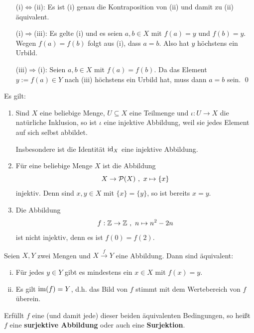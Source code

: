 \begin{bew} \quad
    \begin{itemize}
        \item[(i)$\Leftrightarrow$(ii):] Es ist (i) genau die Kontraposition von (ii) und damit zu (ii) äquivalent.
        \item[(i)$\Rightarrow$(iii):] Es gelte (i) und es seien $a,b\in X$ mit $f(a)=y$ und $f(b)=y$. Wegen $f(a)=f(b)$ folgt aus (i), dass $a=b$. Also hat $y$ höchstens ein Urbild.
        \item[(iii)$\Rightarrow$(i):] Seien $a,b\in X$ mit $f(a)=f(b)$. Da das Element $y:=f(a)\in Y$ nach (iii) höchstens ein Urbild hat, muss dann $a=b$ sein. \qed
    \end{itemize}
\end{bew}


\begin{bsp} Es gilt:
    \begin{enumerate}
        \item Sind $X$ eine beliebige Menge, $U\subseteq X$ eine Teilmenge und $\iota : U\to X$ die natürliche Inklusion, so ist $\iota$ eine injektive Abbildung, weil sie jedes Element auf sich selbst abbildet.
        
        Insbesondere ist die Identität $\mathrm{id}_X$ eine injektive Abbildung.
        \item Für eine beliebige Menge $X$ ist die Abbildung
            \[ X \to \mathcal P(X) \ ,\ x \mapsto \{x\} \]
        injektiv. Denn sind $x,y\in X$ mit $\{x\}=\{y\}$, so ist bereits $x=y$.
        \item Die Abbildung
            \[ f:\mathbb Z \to \mathbb Z \ ,\ n \mapsto n^2-2n \]
        ist nicht injektiv, denn es ist $f(0)=f(2)$.
    \end{enumerate}
\end{bsp}
	

\begin{de} \label{def:surjektiv} 
    Seien $X,Y$ zwei Mengen und $X \xrightarrow{f} Y$ eine Abbildung. Dann sind äquivalent:
    \begin{enumerate}[(i)]
        \item Für jedes $y\in Y$ gibt es mindestens ein $x\in X$ mit $f(x)=y$.
        \item Es gilt $\operatorname{im}(f) = Y$, d.h. das Bild von $f$ stimmt mit dem Wertebereich von $f$ überein.
    \end{enumerate}
    Erfüllt $f$ eine (und damit jede) dieser beiden äquivalenten Bedingungen, so heißt $f$ eine \textbf{surjektive Abbildung} oder auch eine \textbf{Surjektion}.
\end{de}


